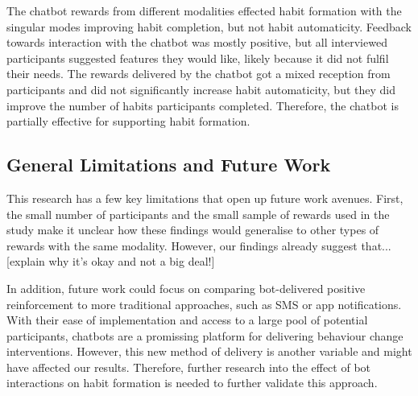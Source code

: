 \documentclass{scaffold/sigchi}
\begin{document}
The chatbot rewards from different modalities effected habit formation with the singular modes improving habit completion, but not habit automaticity. Feedback towards interaction with the chatbot was mostly positive, but all interviewed participants suggested features they would like, likely because it did not fulfil their needs. The rewards delivered by the chatbot got a mixed reception from participants and did not significantly increase habit automaticity, but they did improve the number of habits participants completed. Therefore, the chatbot is partially effective for supporting habit formation.


\subsection{General Limitations and Future Work}
This research has a few key limitations that open up future work avenues. First, the small number of participants and the small sample of rewards used in the study make it unclear how these findings would generalise to other types of rewards with the same modality. However, our findings already suggest that...  [explain why it's okay and not a big deal!]

In addition, future work could focus on comparing bot-delivered positive reinforcement to more traditional approaches, such as SMS or app notifications. With their ease of implementation and access to a large pool of potential participants, chatbots are a promissing platform for delivering behaviour change interventions. However, this new method of delivery is another variable and might have affected our results. Therefore, further research into the effect of bot interactions on habit formation is needed to further validate this approach.   
\end{document}
